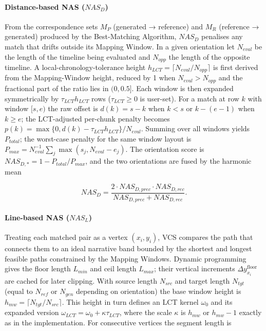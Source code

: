 \documentclass[letterpaper]{article} %
\begin{document}
\paragraph{Distance-based NAS ($NAS_D$)}
From the correspondence sets $M_P$ (generated → reference) and $M_R$ (reference → generated) produced by the Best-Matching Algorithm, $NAS_D$ penalises any match that drifts outside its Mapping Window. In a given orientation let $N_{eval}$ be the length of the timeline being evaluated and $N_{opp}$ the length of the opposite timeline. A local-chronology-tolerance height $h_{LCT} = \lceil N_{eval}/N_{opp} \rceil$ is first derived from the Mapping-Window height, reduced by 1 when $N_{eval} > N_{opp}$ and the fractional part of the ratio lies in $(0, 0.5]$. Each window is then expanded symmetrically by $\tau_{LCT} h_{LCT}$ rows ($\tau_{LCT} \geq 0$ is user-set). For a match at row $k$ with window $[s,e)$ the raw offset is $d(k) = s - k$ when $k < s$ or $k - (e-1)$ when $k \geq e$; the LCT-adjusted per-chunk penalty becomes $p(k) = \max\{0, d(k) - \tau_{LCT} h_{LCT}\}/N_{eval}$. Summing over all windows yields $P_{total}$; the worst-case penalty for the same window layout is $P_{max} = N_{eval}^{-1} \sum_j \max(s_j, N_{eval} - e_j)$. The orientation score is $NAS_{D,*} = 1 - P_{total}/P_{max}$, and the two orientations are fused by the harmonic mean

\begin{equation}
NAS_D = \frac{2 \cdot NAS_{D,prec} \cdot NAS_{D,rec}}{NAS_{D,prec} + NAS_{D,rec}}.
\end{equation}

\paragraph{Line-based NAS ($NAS_L$)}
Treating each matched pair as a vertex $(x_i, y_i)$, VCS compares the path that connects them to an ideal narrative band bounded by the shortest and longest feasible paths constrained by the Mapping Windows. Dynamic programming gives the floor length $L_{min}$ and ceil length $L_{max}$; their vertical increments $\Delta y_{x_i}^{\text{floor}}$ are cached for later clipping. With source length $N_{src}$ and target length $N_{tgt}$ (equal to $N_{ref}$ or $N_{gen}$ depending on orientation) the base window height is $h_{mw} = \lceil N_{tgt}/N_{src} \rceil$. This height in turn defines an LCT kernel $\omega_0$ and its expanded version $\omega_{LCT} = \omega_0 + \kappa \tau_{LCT}$, where the scale $\kappa$ is $h_{mw}$ or $h_{mw} - 1$ exactly as in the implementation. For consecutive vertices the segment length is
\end{document}
